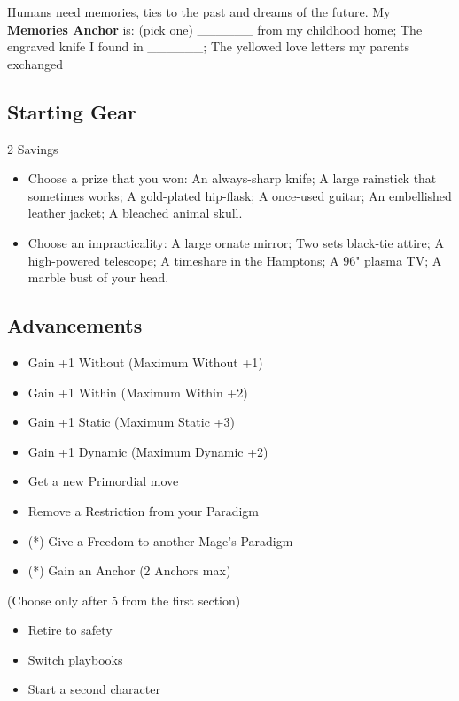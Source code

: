 \documentclass[
  oneside,
  statementpaper,
  9pt]{memoir}
\begin{document}
Humans need memories, ties to the past and dreams of the future. My
\textbf{Memories Anchor} is: (pick one) \_\_\_\_\_\_ from my childhood
home; The engraved knife I found in \_\_\_\_\_\_; The yellowed love
letters my parents exchanged

\hypertarget{starting-gear-5}{%
\subsection{Starting Gear}\label{starting-gear-5}}

2 Savings

\begin{itemize}
\tightlist
\item
  Choose a prize that you won: An always-sharp knife; A large rainstick
  that sometimes works; A gold-plated hip-flask; A once-used guitar; An
  embellished leather jacket; A bleached animal skull.
\item
  Choose an impracticality: A large ornate mirror; Two sets black-tie
  attire; A high-powered telescope; A timeshare in the Hamptons; A 96"
  plasma TV; A marble bust of your head.
\end{itemize}

\hypertarget{advancements-5}{%
\subsection{Advancements}\label{advancements-5}}

\begin{itemize}
\tightlist
\item
  Gain +1 Without (Maximum Without +1)
\item
  Gain +1 Within (Maximum Within +2)
\item
  Gain +1 Static (Maximum Static +3)
\item
  Gain +1 Dynamic (Maximum Dynamic +2)
\item
  Get a new Primordial move
\item
  Remove a Restriction from your Paradigm
\item
  (*) Give a Freedom to another Mage's Paradigm
\item
  (*) Gain an Anchor (2 Anchors max)
\end{itemize}

(Choose only after 5 from the first section)

\begin{itemize}
\tightlist
\item
  Retire to safety
\item
  Switch playbooks
\item
  Start a second character
\end{itemize}
\end{document}
